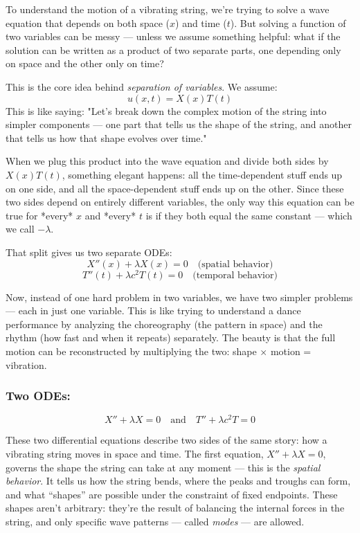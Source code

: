 To understand the motion of a vibrating string, we’re trying to solve a wave equation that depends on both space (\(x\)) and time (\(t\)). But solving a function of two variables can be messy — unless we assume something helpful: what if the solution can be written as a product of two separate parts, one depending only on space and the other only on time?

This is the core idea behind \textit{separation of variables}. We assume:
\[
u(x, t) = X(x) T(t)
\]
This is like saying: "Let’s break down the complex motion of the string into simpler components — one part that tells us the shape of the string, and another that tells us how that shape evolves over time."

When we plug this product into the wave equation and divide both sides by \(X(x)T(t)\), something elegant happens: all the time-dependent stuff ends up on one side, and all the space-dependent stuff ends up on the other. Since these two sides depend on entirely different variables, the only way this equation can be true for *every* \(x\) and *every* \(t\) is if they both equal the same constant — which we call \( -\lambda \).

That split gives us two separate ODEs:
\[
X''(x) + \lambda X(x) = 0 \quad \text{(spatial behavior)}
\]
\[
T''(t) + \lambda c^2 T(t) = 0 \quad \text{(temporal behavior)}
\]

Now, instead of one hard problem in two variables, we have two simpler problems — each in just one variable. This is like trying to understand a dance performance by analyzing the choreography (the pattern in space) and the rhythm (how fast and when it repeats) separately. The beauty is that the full motion can be reconstructed by multiplying the two: shape \(\times\) motion = vibration.

\subsubsection{Two ODEs:}
\[
X'' + \lambda X = 0 \quad \text{and} \quad T'' + \lambda c^2 T = 0
\]

These two differential equations describe two sides of the same story: how a vibrating string moves in space and time. The first equation, \( X'' + \lambda X = 0 \), governs the shape the string can take at any moment — this is the \textit{spatial behavior}. It tells us how the string bends, where the peaks and troughs can form, and what “shapes” are possible under the constraint of fixed endpoints. These shapes aren’t arbitrary: they’re the result of balancing the internal forces in the string, and only specific wave patterns — called \textit{modes} — are allowed.

